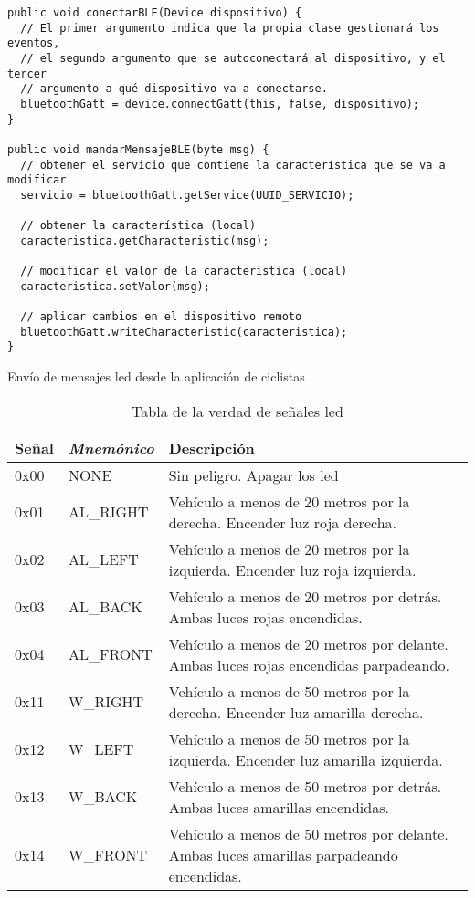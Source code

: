 \begin{description}
		\begin{listing}
			\begin{minipage}{.4\textwidth}
				\begin{verbatim}
public void conectarBLE(Device dispositivo) {
  // El primer argumento indica que la propia clase gestionará los eventos,
  // el segundo argumento que se autoconectará al dispositivo, y el tercer
  // argumento a qué dispositivo va a conectarse.
  bluetoothGatt = device.connectGatt(this, false, dispositivo);
}

public void mandarMensajeBLE(byte msg) {
  // obtener el servicio que contiene la característica que se va a modificar
  servicio = bluetoothGatt.getService(UUID_SERVICIO);

  // obtener la característica (local)
  caracteristica.getCharacteristic(msg);

  // modificar el valor de la característica (local)
  caracteristica.setValor(msg);

  // aplicar cambios en el dispositivo remoto
  bluetoothGatt.writeCharacteristic(caracteristica);
}
				\end{verbatim}
			\end{minipage}
		\caption{Envío de mensajes led desde la aplicación de ciclistas}\label{alg:appciclistasBLE}
	\end{listing}
\end{description}

\begin{table}[H]
	\centering
	\caption{Tabla de la verdad de señales led}\label{tab:tablaVerdadLED}
	\begin{tabular}{lll}
		\toprule
		\textbf{Señal} & \emph{Mnemónico} & Descripción \\
		\midrule
		0x00 & NONE    & Sin peligro. Apagar los led \\
		0x01 & AL\_RIGHT & Vehículo a menos de 20 metros por la derecha. Encender luz
		roja derecha. \\
		0x02 & AL\_LEFT & Vehículo a menos de 20 metros por la izquierda. Encender luz
		roja izquierda. \\
		0x03 & AL\_BACK & Vehículo a menos de 20 metros por detrás. Ambas luces rojas
		encendidas. \\
		0x04 & AL\_FRONT & Vehículo a menos de 20 metros por delante. Ambas luces rojas
		encendidas parpadeando. \\
		0x11 & W\_RIGHT & Vehículo a menos de 50 metros por la derecha. Encender luz
		amarilla derecha. \\
		0x12 & W\_LEFT & Vehículo a menos de 50 metros por la izquierda. Encender luz
		amarilla izquierda. \\
		0x13 & W\_BACK & Vehículo a menos de 50 metros por detrás. Ambas luces amarillas
		encendidas. \\
		0x14 & W\_FRONT & Vehículo a menos de 50 metros por delante. Ambas luces amarillas
		parpadeando encendidas.\\
		\bottomrule
	\end{tabular}
\end{table}
